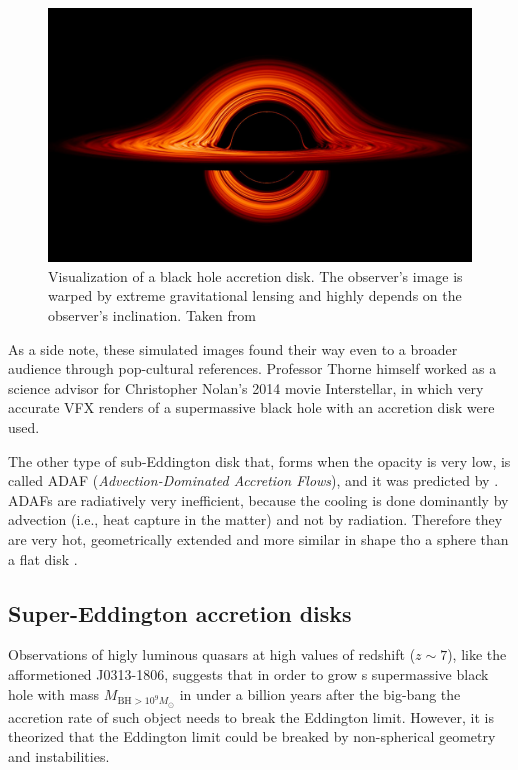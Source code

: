     \begin{figure}[h]
        \centering
        \includegraphics[width=1.0\columnwidth]{img/bh_warped.jpg}
        \caption{Visualization of a black hole accretion disk. The observer's image is warped by extreme gravitational lensing and highly depends on the observer's inclination. Taken from \cite{nasa_img_bh_warped}}
        \label{fig:bh_warped}
    \end{figure}

    As a side note, these simulated images found their way even to a broader audience through pop-cultural references. Professor Thorne himself worked as a science advisor for Christopher Nolan's 2014 movie Interstellar, in which very accurate VFX renders of a supermassive black hole with an accretion disk were used. 

    The other type of sub-Eddington disk that, forms when the opacity is very low, is called ADAF (\emph{Advection-Dominated Accretion Flows}), and it was predicted by \cite{ichimaru1977}. ADAFs are radiatively very inefficient, because the cooling is done dominantly by advection (i.e., heat capture in the matter) and not by radiation. Therefore they are very hot, geometrically extended and more similar in shape tho a sphere than a flat disk \cite{acpow}.

\subsection{Super-Eddington accretion disks}
    Observations of higly luminous quasars at high values of redshift ($z \sim 7$), like the afformetioned J0313-1806, suggests that in order to grow s supermassive black hole with mass $M_{\mathrm{BH} > 10^9 M_{\odot}}$ in under a billion years after the big-bang the accretion rate of such object needs to break the Eddington limit. However, it is theorized that the Eddington limit could be breaked by non-spherical geometry and instabilities\cite{brightman2019}.

